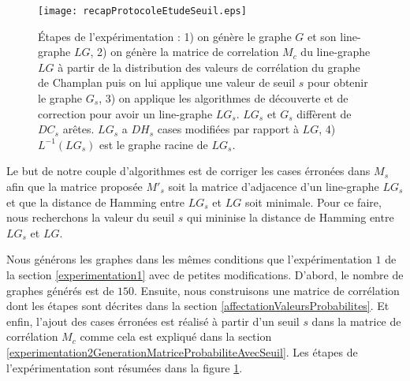 \begin{figure}[htb!] 
\centering
\texttt{[image: recapProtocoleEtudeSeuil.eps]}
\caption{\'Etapes de l'exp\'erimentation :  
1) on g\'en\`ere le graphe $G$ et son line-graphe $LG$, 
2) on  g\'en\`ere la matrice de correlation $M_c$ du line-graphe $LG$   \`a partir de la distribution des valeurs de corr\'elation du graphe de Champlan puis on lui applique une valeur de seuil $s$ pour obtenir le graphe $G_{s}$, 
3) on applique les algorithmes de d\'ecouverte et de correction pour avoir un line-graphe $LG_{s}$. $LG_{s}$ et  $G_{s}$ diff\`erent de $DC_{s}$ ar\^etes. $LG_{s}$ a $DH_{s}$ cases modifi\'ees par rapport \`a $LG$, 
4) $L^{-1}(LG_{s})$ est le graphe racine de $LG_{s}$. 
}
\label{recapProtocoleEtudeSeuil} 
\end{figure}

Le but de notre couple d'algorithmes est de corriger les cases \'erron\'ees dans $M_s$ afin que la matrice propos\'ee $M'_{s}$ soit la matrice d'adjacence d'un line-graphe $LG_s$ et que la distance de Hamming entre $LG_s$ et $LG$ soit minimale. 
Pour ce faire, nous recherchons la valeur du seuil $s$ qui mininise la distance de Hamming entre $LG_s$ et $LG$.
\newline

Nous g\'en\'erons les graphes dans les m\^emes conditions que l'exp\'erimentation $1$ de la section \ref{experimentation1} avec de petites modifications. D'abord, le nombre de graphes g\'en\'er\'es est de $150$. Ensuite, nous construisons une matrice de corr\'elation dont les \'etapes sont d\'ecrites dans la section \ref{affectationValeursProbabilites}. Et enfin, l'ajout des cases \'erron\'ees est r\'ealis\'e \`a partir d'un seuil $s$ dans la matrice de corr\'elation $M_c$ comme cela est expliqu\'e dans la section \ref{experimentation2GenerationMatriceProbabiliteAvecSeuil}. 
Les \'etapes de l'exp\'erimentation sont r\'esum\'ees dans la figure \ref{recapProtocoleEtudeSeuil}.

